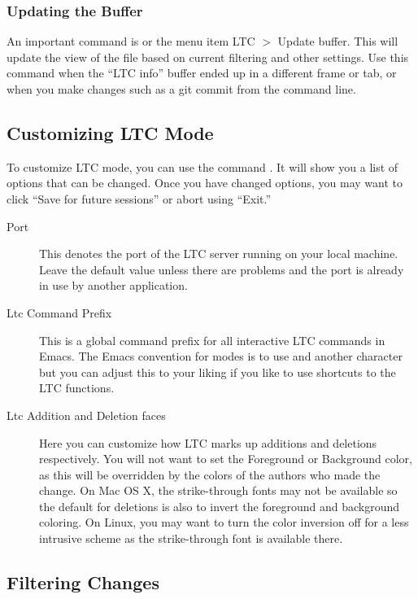 \subsubsection{Updating the Buffer}

An important command is  or the menu item LTC $>$ Update buffer.  This will update the  view of the file based on current filtering and other settings.  Use this command when the ``LTC info'' buffer ended up in a different frame or tab, or when you make changes such as a git commit from the command line.

\subsection{Customizing LTC Mode}

To customize LTC mode, you can use the command .  It will show you a list of options that can be changed.  Once you have changed options, you may want to click ``Save for future sessions'' or abort using ``Exit.''

\begin{description}
\item[Port] This denotes the port of the LTC server running on your local machine.  Leave the default value unless there are problems and the port is already in use by another application.
\item[Ltc Command Prefix] This is a global command prefix for all interactive LTC commands in Emacs.  The Emacs convention for modes is to use  and another character but you can adjust this to your liking if you like to use shortcuts to the LTC functions.
\item[Ltc Addition and Deletion faces]  Here you can customize how LTC marks up additions and deletions respectively.  You will not want to set the Foreground or Background color, as this will be overridden by the colors of the authors who made the change.  On Mac OS X, the strike-through fonts may not be available so the default for deletions is also to invert the foreground and background coloring.  On Linux, you may want to turn the color inversion off for a less intrusive scheme as the strike-through font is available there.
\end{description}

\subsection{Filtering Changes}

